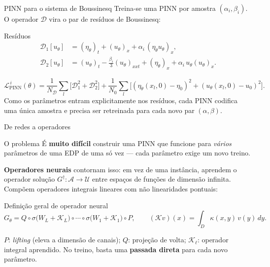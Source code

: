 \begin{frame}{PINN para o sistema de Boussinesq}
  Treina-se \alert{uma PINN por amostra} $(\alpha_i,\beta_i)$. O operador $\mathcal{D}$ vira o
  par de resíduos de Boussinesq:
  \begin{block}{Resíduos}
    \small
    \begin{align*}
      \mathcal{D}_1[u_\theta] &= (\eta_\theta)_t + (u_\theta)_x + \alpha_i\,(\eta_\theta u_\theta)_x, \\
      \mathcal{D}_2[u_\theta] &= (u_\theta)_t - \tfrac{\beta_i}{3}(u_\theta)_{xxt} + (\eta_\theta)_x + \alpha_i\,u_\theta (u_\theta)_x.
    \end{align*}
  \end{block}
  \begin{equation*}
    \mathcal{L}^{\,i}_{\text{PINN}}(\theta) =
    \frac{1}{N_\mathcal{D}}\sum_l \bigl[\mathcal{D}_1^2 + \mathcal{D}_2^2\bigr]
    + \frac{1}{N_0}\sum_l \bigl[(\eta_\theta(x_l,0)-\eta_0)^2 + (u_\theta(x_l,0)-u_0)^2\bigr].
  \end{equation*}
  Como os parâmetros entram explicitamente nos resíduos, \alert{cada PINN codifica uma única
  amostra} e precisa ser retreinada para cada novo par $(\alpha,\beta)$.
\end{frame}

\begin{frame}{De redes a operadores}
  \begin{alertblock}{O problema}
    É \textbf{muito difícil} construir uma PINN que funcione para \emph{vários} parâmetros de
    uma EDP de uma só vez --- cada parâmetro exige um novo treino.
  \end{alertblock}

  \textbf{Operadores neurais} contornam isso: em vez de uma instância, aprendem o
  \alert{operador solução} $G^\dagger:\mathcal{A}\to\mathcal{U}$ entre espaços de funções de
  dimensão infinita. Compõem operadores integrais lineares com não linearidades pontuais:
  \begin{block}{Definição geral de operador neural}
    \begin{equation*}
      G_\theta = Q \circ \sigma\!\bigl(W_L + \mathcal{K}_L\bigr)\circ\cdots\circ
                 \sigma\!\bigl(W_1 + \mathcal{K}_1\bigr)\circ P,
      \qquad
      (\mathcal{K}v)(x) = \int_D \kappa(x,y)\,v(y)\,dy.
    \end{equation*}
  \end{block}
  \footnotesize
  $P$: \emph{lifting} (eleva a dimensão de canais); $Q$: projeção de volta; $\mathcal{K}_\ell$:
  operador integral aprendido. No treino, basta uma \textbf{passada direta} para cada novo
  parâmetro.
\end{frame}

